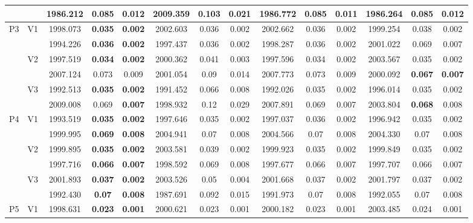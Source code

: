 \documentclass[12pt,a4paper]{article}
\begin{document}
\begin{sidewaystable}[ht]
{\begin{tabular}{cc|ccc|ccc|ccc|ccc|}
   &  & 1986.212 & \textbf{0.085} & 0.012 & 2009.359 & 0.103 & 0.021 & 1986.772 & 0.085 & \textbf{0.011} & 1986.264 & 0.085 & 0.012 \\ 
   \hline \hline\multirow{6}{*}{P3} & \multirow{2}{*}{V1} & 1998.073 & \textbf{0.035} & \textbf{0.002} & 2002.603 & 0.036 & 0.002 & 2002.662 & 0.036 & 0.002 & 1999.254 & 0.038 & 0.002 \\ 
   &  & 1994.226 & \textbf{0.036} & \textbf{0.002} & 1997.437 & 0.036 & 0.002 & 1998.287 & 0.036 & 0.002 & 2001.022 & 0.069 & 0.007 \\ 
   & \multirow{2}{*}{V2} & 1997.519 & \textbf{0.034} & \textbf{0.002} & 2000.362 & 0.041 & 0.003 & 1997.596 & 0.034 & 0.002 & 2003.567 & 0.035 & 0.002 \\ 
   &  & 2007.124 & 0.073 & 0.009 & 2001.054 & 0.09 & 0.014 & 2007.773 & 0.073 & 0.009 & 2000.092 & \textbf{0.067} & \textbf{0.007} \\ 
   & \multirow{2}{*}{V3} & 1992.513 & \textbf{0.035} & \textbf{0.002} & 1991.452 & 0.066 & 0.008 & 1992.026 & 0.035 & 0.002 & 1996.014 & 0.035 & 0.002 \\ 
   &  & 2009.008 & 0.069 & \textbf{0.007} & 1998.932 & 0.12 & 0.029 & 2007.891 & 0.069 & 0.007 & 2003.804 & \textbf{0.068} & 0.008 \\ 
   \hline \hline\multirow{6}{*}{P4} & \multirow{2}{*}{V1} & 1993.519 & \textbf{0.035} & \textbf{0.002} & 1997.646 & 0.035 & 0.002 & 1997.037 & 0.036 & 0.002 & 1996.942 & 0.035 & 0.002 \\ 
   &  & 1999.995 & \textbf{0.069} & \textbf{0.008} & 2004.941 & 0.07 & 0.008 & 2004.566 & 0.07 & 0.008 & 2004.330 & 0.07 & 0.008 \\ 
   & \multirow{2}{*}{V2} & 1999.895 & \textbf{0.035} & \textbf{0.002} & 2003.581 & 0.039 & 0.002 & 1999.923 & 0.035 & 0.002 & 1999.849 & 0.035 & 0.002 \\ 
   &  & 1997.716 & \textbf{0.066} & \textbf{0.007} & 1998.592 & 0.069 & 0.008 & 1997.677 & 0.066 & 0.007 & 1997.707 & 0.066 & 0.007 \\ 
   & \multirow{2}{*}{V3} & 2001.893 & \textbf{0.037} & \textbf{0.002} & 2003.526 & 0.05 & 0.004 & 2001.668 & 0.037 & 0.002 & 2001.797 & 0.037 & 0.002 \\ 
   &  & 1992.430 & \textbf{0.07} & \textbf{0.008} & 1987.691 & 0.092 & 0.015 & 1991.973 & 0.07 & 0.008 & 1992.055 & 0.07 & 0.008 \\ 
   \hline \hline\multirow{6}{*}{P5} & \multirow{2}{*}{V1} & 1998.631 & \textbf{0.023} & \textbf{0.001} & 2000.621 & 0.023 & 0.001 & 2000.182 & 0.023 & 0.001 & 2003.485 & 0.024 & 0.001 \\ 

\end{tabular}}
\end{sidewaystable}
\end{document}
